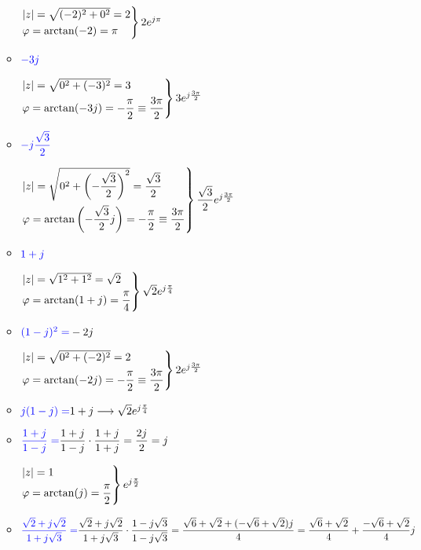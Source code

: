 \begin{enumerate}[label=\color{red}\textbf{\arabic*)}, leftmargin=*]
\begin{itemize}[label=\color{red}\textbullet, leftmargin=*]
		$\begin{rcases}
			|z|=\sqrt{(-2)^2+0^2}=2\\
			\varphi=\arctan(-2)=\pi
		\end{rcases}2e^{j\pi}$
		
		\item $\textcolor{blue}{-3j}$
		
		$\begin{rcases}
			|z|=\sqrt{0^2+(-3)^2}=3\\
			\varphi=\arctan(-3j)=-\dfrac{\pi}{2}\equiv\dfrac{3\pi}{2}
		\end{rcases}3e^{j\frac{3\pi}{2}}$
		\item $\textcolor{blue}{-j\dfrac{\sqrt{3}}{2}}$
		
		$\begin{rcases}
			|z|=\sqrt{0^2+\left(-\dfrac{\sqrt{3}}{2}\right)^2}=\dfrac{\sqrt{3}}{2}\\
			\varphi=\arctan\left(-\dfrac{\sqrt{3}}{2}j\right)=-\dfrac{\pi}{2}\equiv\dfrac{3\pi}{2}
		\end{rcases}\dfrac{\sqrt{3}}{2}e^{j\frac{3\pi}{2}}$
		\item $\textcolor{blue}{1+j}$
		
		$\begin{rcases}
			|z|=\sqrt{1^2+1^2}=\sqrt{2}\\
			\varphi=\arctan(1+j)=\dfrac{\pi}{4}
		\end{rcases}\sqrt{2}e^{j\frac{\pi}{4}}$
		
		\item $\textcolor{blue}{(1-j)^2=}-2j$
		
		$\begin{rcases}
			|z|=\sqrt{0^2+(-2)^2}=2\\
			\varphi=\arctan(-2j)=-\dfrac{\pi}{2}\equiv\dfrac{3\pi}{2}
		\end{rcases}2e^{j\frac{3\pi}{2}}$
		\item $\textcolor{blue}{j(1-j)=}1+j\longrightarrow\sqrt{2}e^{j\frac{\pi}{4}}$
		
		\item $\textcolor{blue}{\dfrac{1+j}{1-j}=}\dfrac{1+j}{1-j}\cdot\dfrac{1+j}{1+j}=\dfrac{2j}{2}=j$
		
		$\begin{rcases}
			|z|=1\\
			\varphi=\arctan(j)=\dfrac{\pi}{2}
		\end{rcases}e^{j\frac{\pi}{2}}$
		\item $\textcolor{blue}{\dfrac{\sqrt{2}+j\sqrt{2}}{1+j\sqrt{3}}=}\dfrac{\sqrt{2}+j\sqrt{2}}{1+j\sqrt{3}}\cdot\dfrac{1-j\sqrt{3}}{1-j\sqrt{3}}=\dfrac{\sqrt{6}+\sqrt{2}+(-\sqrt{6}+\sqrt{2})j}{4}=\dfrac{\sqrt{6}+\sqrt{2}}{4}+\dfrac{-\sqrt{6}+\sqrt{2}}{4}j$
		

\end{itemize}
\end{enumerate}

